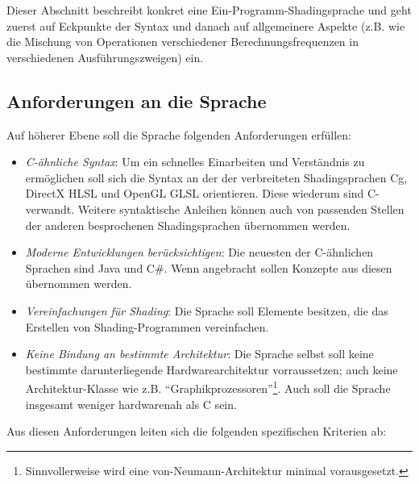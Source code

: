 Dieser Abschnitt beschreibt konkret eine Ein-Programm-Shadingsprache und geht zuerst auf Eckpunkte der Syntax und danach
auf allgemeinere Aspekte (z.B. wie die Mischung von Operationen verschiedener Berechnungsfrequenzen in verschiedenen Ausführungszweigen) ein.

\subsection{Anforderungen an die Sprache}

Auf höherer Ebene soll die Sprache folgenden Anforderungen erfüllen:
\begin{itemize}
\item \emph{C-ähnliche Syntax}: Um ein schnelles Einarbeiten und Verständnis zu ermöglichen soll sich die Syntax an der der verbreiteten
Shadingsprachen Cg, DirectX HLSL und OpenGL GLSL orientieren. Diese wiederum sind C-verwandt.
Weitere syntaktische Anleihen können auch von passenden Stellen der anderen besprochenen  Shadingsprachen übernommen werden.
\item \emph{Moderne Entwicklungen berücksichtigen}: Die neuesten der C-ähnlichen Sprachen sind Java und C\#. Wenn angebracht sollen
Konzepte aus diesen übernommen werden.
\item \emph{Vereinfachungen für Shading}: Die Sprache soll Elemente besitzen, die das Erstellen von Shading-Programmen
vereinfachen. \item \emph{Keine Bindung an bestimmte Architektur}: Die Sprache selbst soll keine bestimmte darunterliegende Hardwarearchitektur
vorraussetzen; auch keine Architektur-Klasse wie z.B. "`Graphikprozessoren"'\footnote{Sinnvollerweise wird eine von-Neumann-Architektur minimal vorausgesetzt.}.
Auch soll die Sprache insgesamt weniger hardwarenah als C sein.
\end{itemize}


Aus diesen Anforderungen leiten sich die folgenden spezifischen Kriterien ab:

